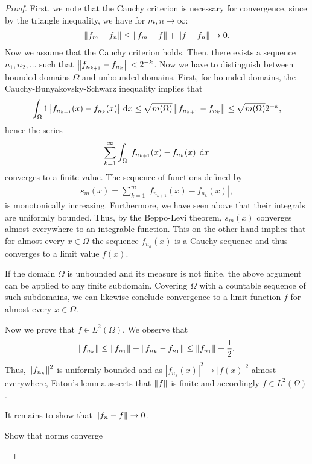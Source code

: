 \begin{proof}
  First, we note that the Cauchy criterion is necessary for
  convergence, since by the triangle inequality, we have for
  $m,n\to\infty$:
  \begin{gather*}
    \left\|f_m-f_n\right\| \le \left\|f_m-f\right\| + \left\|f-f_n\right\| \to 0.
  \end{gather*}
  Now we assume that the Cauchy criterion holds. Then, there exists
  a sequence $n_1,n_2,\dots$ such that $\left\|f_{n_{k+1}}- f_{n_k}\right\|
  <2^{-k}$. Now we have to distinguish between bounded domains
  $\Omega$ and unbounded domains. First, for bounded domains, the
  Cauchy-Bunyakovsky-Schwarz inequality implies that
  \begin{gather*}
    \int_\Omega 1 \left|f_{n_{k+1}}(x)- f_{n_k}(x)\right|\,\mathrm{d} x \le \sqrt{m(\Omega)}
    \left\|f_{n_{k+1}}- f_{n_k}\right\| \le \sqrt{m(\Omega)}2^{-k},
  \end{gather*}
  hence the series
  \begin{gather*}
    \sum_{k=1}^\infty \int_\Omega |f_{n_{k+1}}(x)- f_{n_k}(x)|\,\mathrm{d} x
  \end{gather*}
  converges to a finite value. The sequence of functions defined by
  \begin{gather*}
    s_m(x) = \sum_{k=1}^m |f_{n_{k+1}}(x)- f_{n_k}(x)|,
  \end{gather*}
  is monotonically increasing. Furthermore, we have seen above that
  their integrals are uniformly bounded. Thus, by the Beppo-Levi
  theorem, $s_m(x)$ converges almost everywhere to an integrable
  function. This on the other hand implies that for almost every $x\in
  \Omega$ the sequence $f_{n_k}(x)$ is a Cauchy sequence and thus
  converges to a limit value $f(x)$.
  
  If the domain $\Omega$ is unbounded and its measure is not finite,
  the above argument can be applied to any finite subdomain. Covering
  $\Omega$ with a countable sequence of such subdomains, we can
  likewise conclude convergence to a limit function $f$ for
  almost every $x\in\Omega$.

  Now we prove that $f\in L^2(\Omega)$. We observe that
  \begin{gather*}
    \left\|f_{n_k}\right\| \le \left\|f_{n_1}\right\| + \left\|f_{n_k}-f_{n_1}\right\| \le \left\|f_{n_1}\right\|+\frac12.
  \end{gather*}
  Thus, $\left\|f_{n_k}\right\|^2$ is uniformly bounded and as $|f_{n_k}(x)|^2
  \to |f(x)|^2$ almost everywhere, Fatou's lemma asserts that
  $\left\|f\right\|$ is finite and accordingly $f\in L^2(\Omega)$.

  It remains to show that $\left\|f_n-f\right\|\to 0$.
  \begin{todo}
    Show that norms converge
  \end{todo}
\end{proof}

